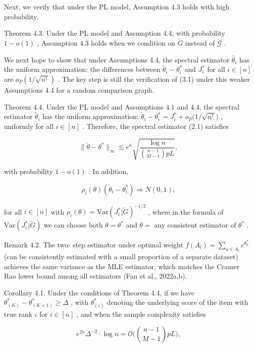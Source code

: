 Next, we verify that under the PL model, Assumption 4.3 holds with high
probability.

Theorem 4.3. Under the PL model and Assumption 4.4, with probability
\(1 - o(1)\) , Assumption 4.3 holds when we condition on
\(\widetilde{G}\) instead of \(\mathcal{G}\) .

We next hope to show that under Assumptions 4.4, the spectral estimator
\(\widehat{\theta}_{i}\) has the uniform approximation: the differences
between \(\widetilde{\theta}_{i} - \theta_{i}^{*}\) and \(J_{i}^{*}\)
for all \(i\in [n]\) are \(o_{P}(1 / \sqrt{n^{\dagger}})\) . The key
step is still the verification of (3.1) under this weaker Assumptions
4.4 for a random comparison graph.

Theorem 4.4. Under the PL model and Assumptions 4.1 and 4.4, the
spectral estimator \(\widetilde{\theta}_{i}\) has the uniform
approximation:
\(\widetilde{\theta}_{i} - \theta_{i}^{*} = J_{i}^{*} + o_{P}\big(1 / \sqrt{n^{\dagger}}\big)\)
, uniformly for all \(i\in [n]\) . Therefore, the spectral estimator
(2.1) satisfies

\[
\| \widetilde{\theta} -\theta^{*}\|_{\infty}\lesssim e^{\bar{\kappa}}\sqrt{\frac{\log n}{\binom{n - 1}{M - 1}pL}}, \tag{4.5}
\]

with probability \(1 - o(1)\) . In addition,

\[
\rho_{i}(\theta)(\widetilde{\theta}_{i} - \theta_{i}^{*})\Rightarrow N(0,1),
\]

for all \(i\in [n]\) with
\(\rho_{i}(\theta) = \mathrm{Var}(J_{i}^{*}|\widetilde{G})^{- 1 / 2}\) ,
where in the formula of \(\mathrm{Var}(J_{i}^{*}|\widetilde{G})\) we can
choose both \(\theta = \theta^{*}\) and \(\theta =\) any consistent
estimator of \(\theta^{*}\) .

Remark 4.2. The two- step estimator under optimal weight
\(f(A_{l}) = \sum_{u\in A_{l}}e^{\theta_{u}^{*}}\) (can be consistently
estimated with a small proportion of a separate dataset) achieves the
same variance as the MLE estimator, which matches the Cramer Rao lower
bound among all estimators (Fan et al., 2022a,b).

Corollary 4.1. Under the conditions of Theorem 4.4, if we have
\(\theta_{(K)}^{*} - \theta_{(K + 1)}^{*}\geq \Delta\) , with
\(\theta_{(i)}^{*}\) denoting the underlying score of the item with true
rank \(i\) for \(i\in [n]\) , and when the sample complexity satisfies

\[
e^{2\bar{\kappa}}\Delta^{-2}\cdot \log n = \mathcal{O}\bigg(\binom{n-1}{M-1}pL\bigg),
\]

